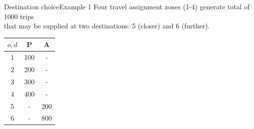 \documentclass[8pt]{beamer}
\begin{document}
\begin{frame}{Destination choice}{Example 1}
Four travel assignment zones (1-4) generate total of 1000 trips\\
that may be supplied at two destinations: 5 (closer) and 6 (further).
\begin{center}
\begin{minipage}{0.65\textwidth}
        
    \end{minipage}\hfill
    \begin{minipage}{0.25\textwidth}
     \begin{center}
\begin{tabular}{|c|c|c|}
\hline 
{$o,d$} & P & A \\ 
\hline 
1 & 100 & -  \\ 
\hline 
2 & 200 & -  \\ 
\hline 
3 & 300 & -  \\ 
\hline 
4 & 400 & -    \\ 
\hline 
5 & - & 200  \\ 
\hline 
6 & - & 800  \\ 
\hline
\end{tabular}
\end{center}   
    \end{minipage}
\end{center}

\end{frame}
\end{document}
